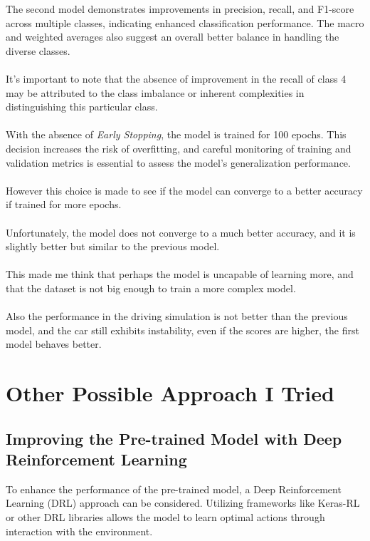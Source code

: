 \documentclass{article}
\begin{document}
The second model demonstrates improvements in precision, recall, and F1-score across multiple classes, indicating enhanced classification performance. The macro and weighted averages also suggest an overall better balance in handling the diverse classes.
\\
\\
It's important to note that the absence of improvement in the recall of class 4 may be attributed to the class imbalance or inherent complexities in distinguishing this particular class.
\\
\\
With the absence of \emph{Early Stopping}, the model is trained for 100 epochs. This decision increases the risk of overfitting, and careful monitoring of training and validation metrics is essential to assess the model's generalization performance.
\\
\\
However this choice is made to see if the model can converge to a better accuracy if trained for more epochs.
\\
\\
Unfortunately, the model does not converge to a much better accuracy, and it is slightly better but similar to the previous model.
\\
\\
This made me think that perhaps the model is uncapable of learning more, and that the dataset is not big enough to train a more complex model.
\\
\\
Also the performance in the driving simulation is not better than the previous model, and the car still exhibits instability, even if the scores are higher, the first model behaves better.

\section{Other Possible Approach I Tried}

\subsection{Improving the Pre-trained Model with Deep Reinforcement Learning}

To enhance the performance of the pre-trained model, a Deep Reinforcement Learning (DRL) approach can be considered. Utilizing frameworks like Keras-RL or other DRL libraries allows the model to learn optimal actions through interaction with the environment.
\end{document}
